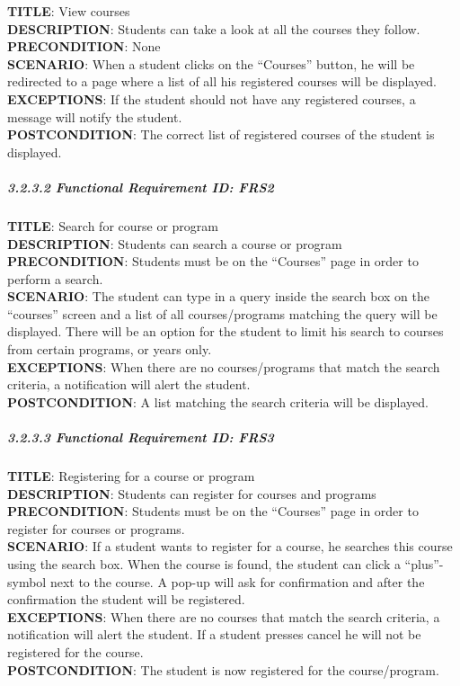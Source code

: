 \documentclass[12pt]{article}
\begin{document}
\textbf{TITLE}: View courses\\\textbf{DESCRIPTION}: Students can take a
look at all the courses they follow.\\\textbf{PRECONDITION}:
None\\\textbf{SCENARIO}: When a student clicks on the ``Courses''
button, he will be redirected to a page where a list of all his
registered courses will be displayed.\\\textbf{EXCEPTIONS}: If the
student should not have any registered courses, a message will notify
the student.\\\textbf{POSTCONDITION}: The correct list of registered
courses of the student is displayed.

\subparagraph{3.2.3.2 Functional Requirement \textbf{ID}:
FRS2\\}\label{functional-requirement-id-frs2}

\textbf{TITLE}: Search for course or program\\\textbf{DESCRIPTION}:
Students can search a course or program\\\textbf{PRECONDITION}: Students
must be on the ``Courses'' page in order to perform a
search.\\\textbf{SCENARIO}: The student can type in a query inside the
search box on the ``courses'' screen and a list of all courses/programs
matching the query will be displayed. There will be an option for the
student to limit his search to courses from certain programs, or years
only.\\\textbf{EXCEPTIONS}: When there are no courses/programs that
match the search criteria, a notification will alert the
student.\\\textbf{POSTCONDITION}: A list matching the search criteria
will be displayed.

\subparagraph{3.2.3.3 Functional Requirement \textbf{ID}:
FRS3\\}\label{functional-requirement-id-frs3}

\textbf{TITLE}: Registering for a course or
program\\\textbf{DESCRIPTION}: Students can register for courses and
programs\\\textbf{PRECONDITION}: Students must be on the ``Courses''
page in order to register for courses or programs.\\\textbf{SCENARIO}:
If a student wants to register for a course, he searches this course
using the search box. When the course is found, the student can click a
``plus''-symbol next to the course. A pop-up will ask for confirmation
and after the confirmation the student will be
registered.\\\textbf{EXCEPTIONS}: When there are no courses that match
the search criteria, a notification will alert the student. If a student
presses cancel he will not be registered for the
course.\\\textbf{POSTCONDITION}: The student is now registered for the
course/program.
\end{document}
